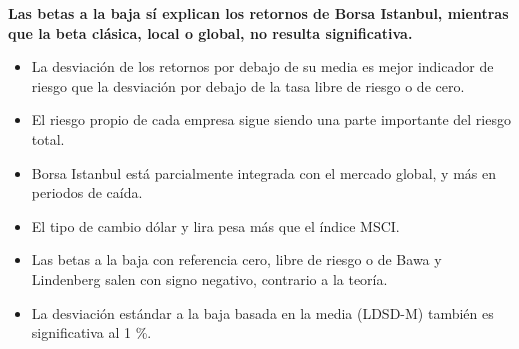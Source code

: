 \documentclass{article}
\newcommand{\bodysize}{\fontsize{27}{35.6}\selectfont}
\newcommand{\cardtitlesize}{\fontsize{31.9}{38.3}\selectfont}
\newcommand{\smallsize}{\fontsize{22.1}{28.7}\selectfont}
\newcommand{\cardtitle}[2][navy]{{\color{#1}\cardtitlesize\bfseries\textls[110]{\MakeUppercase{#2}}}\par\vspace{7mm}}
\begin{document}
\vfill
\hspace*{34mm}\begin{minipage}{773mm}
\begin{tcolorbox}[card=teal]\cardtitle[teal]{Resultados}
\begin{tcolorbox}[enhanced, sharp corners, colback=tealSoft, boxrule=0pt, left=14mm, right=14mm, top=10mm, bottom=11mm,
  borderline west={4mm}{0mm}{teal}, fontupper=\bodysize\color{ink}\raggedright]
{\color{teal}\smallsize\bfseries{}}\par\vspace{4mm}
{\bfseries Las betas a la baja sí explican los retornos de Borsa Istanbul, mientras que la beta clásica, local o global, no resulta significativa.}
\end{tcolorbox}
\vspace{11mm}
\begin{minipage}[t]{0.48\linewidth}
\begin{itemize}
\item La desviación de los retornos por debajo de su media es mejor indicador de riesgo que la desviación por debajo de la tasa libre de riesgo o de cero.
\item El riesgo propio de cada empresa sigue siendo una parte importante del riesgo total.
\item Borsa Istanbul está parcialmente integrada con el mercado global, y más en periodos de caída.
\end{itemize}
\end{minipage}\hfill
\begin{minipage}[t]{0.48\linewidth}
\begin{itemize}
\item El tipo de cambio dólar y lira pesa más que el índice MSCI.
\item Las betas a la baja con referencia cero, libre de riesgo o de Bawa y Lindenberg salen con signo negativo, contrario a la teoría.
\item La desviación estándar a la baja basada en la media (LDSD-M) también es significativa al 1 \%.
\end{itemize}
\end{minipage}
\end{tcolorbox}
\end{minipage}
\end{document}
